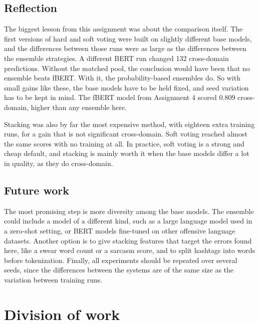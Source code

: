 \documentclass[11pt,a4paper]{article}
\begin{document}
\subsection{Reflection}

The biggest lesson from this assignment was about the comparison itself. The first versions of hard and soft voting were built on slightly different base models, and the differences between those runs were as large as the differences between the ensemble strategies. A different BERT run changed 132 cross-domain predictions. Without the matched pool, the conclusion would have been that no ensemble beats fBERT. With it, the probability-based ensembles do. So with small gains like these, the base models have to be held fixed, and seed variation has to be kept in mind. The fBERT model from Assignment 4 scored 0.809 cross-domain, higher than any ensemble here.

Stacking was also by far the most expensive method, with eighteen extra training runs, for a gain that is not significant cross-domain. Soft voting reached almost the same scores with no training at all. In practice, soft voting is a strong and cheap default, and stacking is mainly worth it when the base models differ a lot in quality, as they do cross-domain.

\subsection{Future work}

The most promising step is more diversity among the base models. The ensemble could include a model of a different kind, such as a large language model used in a zero-shot setting, or BERT models fine-tuned on other offensive language datasets. Another option is to give stacking features that target the errors found here, like a swear word count or a sarcasm score, and to split hashtags into words before tokenization. Finally, all experiments should be repeated over several seeds, since the differences between the systems are of the same size as the variation between training runs.




\appendix

\section{Division of work}
\end{document}
